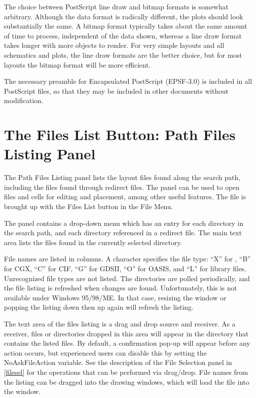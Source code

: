 The choice between PostScript line draw and bitmap formats is somewhat
arbitrary.  Although the data format is radically different, the plots
should look substantially the same.  A bitmap format typically takes
about the same amount of time to process, independent of the data
shown, whereas a line draw format takes longer with more objects to
render.  For very simple layouts and all schematics and {\WRspice}
plots, the line draw formats are the better choice, but for most
layouts the bitmap format will be more efficient.

The necessary preamble for Encapsulated PostScript (EPSF-3.0) is
included in all PostScript files, so that they may be included in
other documents without modification.


\section{The {\cb Files List} Button: {\cb Path Files Listing} Panel}

The {\cb Path Files Listing} panel lists the layout files found along
the search path, including the files found through redirect files. 
The panel can be used to open files and cells for editing and
placement, among other useful features.  The file is brought up with
the {\cb Files List} button in the {\cb File Menu}.

The panel contains a drop-down menu which has an entry for each
directory in the search path, and each directory referenced in a
redirect file.  The main text area lists the files found in the
currently selected directory.

File names are listed in columns.  A character specifies the file
type:  ``X'' for {\Xic}, ``B'' for CGX, ``C'' for CIF, ``G'' for
GDSII, ``O'' for OASIS, and ``L'' for library files.  Unrecognized
file types are not listed.  The directories are polled periodically,
and the file listing is refreshed when changes are found. 
Unfortunately, this is not available under Windows 95/98/ME.  In that
case, resizing the window or popping the listing down then up again
will refresh the listing.

The text area of the files listing is a drag and drop source and
receiver.  As a receiver, files or directories dropped in this area
will appear in the directory that contains the listed files.  By
default, a confirmation pop-up will appear before any action occurs,
but experienced users can disable this by setting the {\et
NoAskFileAction} variable.  See the description of the {\cb File
Selection} panel in \ref{filesel} for the operations that can be
performed via drag/drop.  File names from the listing can be dragged
into the drawing windows, which will load the file into the window.

